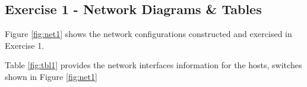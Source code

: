 \documentclass[main.tex]{subfiles}
\begin{document}
\subsection{Exercise 1 - Network  Diagrams \& Tables}
\noindent Figure \ref{fig:net1} shows the network configurations constructed and exercised in Exercise 1.\\


\noindent Table \ref{fig:tbl1} provides the network interfaces information for the hosts, switches shown in Figure \ref{fig:net1}
\end{document}
